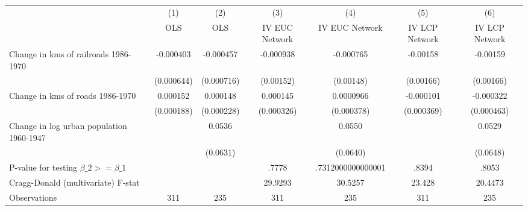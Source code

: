 {
\def\sym#1{\ifmmode^{#1}\else\(^{#1}\)\fi}
\begin{tabular}{l*{6}{c}}
\hline\hline
                &\multicolumn{1}{c}{(1)}&\multicolumn{1}{c}{(2)}&\multicolumn{1}{c}{(3)}&\multicolumn{1}{c}{(4)}&\multicolumn{1}{c}{(5)}&\multicolumn{1}{c}{(6)}\\
                &\multicolumn{1}{c}{OLS}&\multicolumn{1}{c}{OLS}&\multicolumn{1}{c}{IV EUC Network}&\multicolumn{1}{c}{IV EUC Network}&\multicolumn{1}{c}{IV LCP Network}&\multicolumn{1}{c}{IV LCP Network}\\
\hline
Change in kms of railroads 1986-1970&-0.000403         &-0.000457         &-0.000938         &-0.000765         & -0.00158         & -0.00159         \\
                &(0.000644)         &(0.000716)         &(0.00152)         &(0.00148)         &(0.00166)         &(0.00166)         \\
[1em]
Change in kms of roads 1986-1970& 0.000152         & 0.000148         & 0.000145         &0.0000966         &-0.000101         &-0.000322         \\
                &(0.000188)         &(0.000228)         &(0.000326)         &(0.000378)         &(0.000369)         &(0.000463)         \\
[1em]
Change in log urban population 1960-1947&                  &   0.0536         &                  &   0.0550         &                  &   0.0529         \\
                &                  & (0.0631)         &                  & (0.0640)         &                  & (0.0648)         \\
\hline
P-value for testing $\beta\_{2} >= \beta\_{1}$&                  &                  &    .7778         &.7312000000000001         &    .8394         &    .8053         \\
Cragg-Donald (multivariate) F-stat&                  &                  &  29.9293         &  30.5257         &   23.428         &  20.4473         \\
Observations    &      311         &      235         &      311         &      235         &      311         &      235         \\
\hline\hline
\end{tabular}
}
